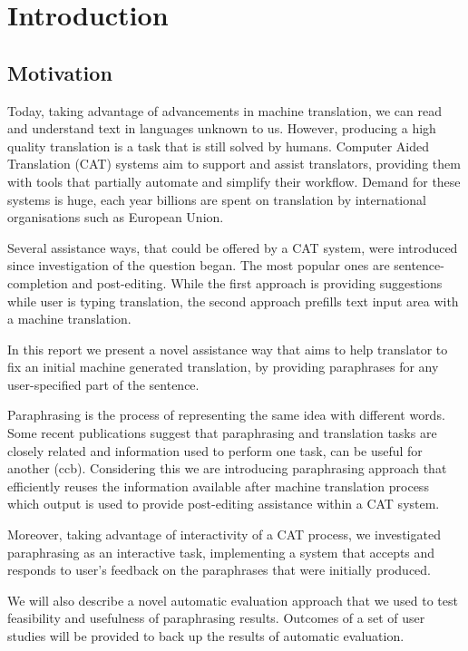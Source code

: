 \chapter{Introduction}
  
\section{Motivation}

Today, taking advantage of advancements in machine translation, we can read and understand text in languages unknown to us. However, producing a high quality translation is a task that is still solved by humans. Computer Aided Translation (CAT) systems aim to support and assist translators, providing them with tools that partially automate and simplify their workflow. Demand for these systems is huge, each year billions are spent on translation by international organisations such as European Union. 

Several assistance ways, that could be offered by a CAT system, were introduced since investigation of the question began. The most popular ones are sentence-completion and post-editing. While the first approach is providing suggestions while user is typing translation, the second approach prefills text input area with a machine translation. 

In this report we present a novel assistance way that aims to help translator to fix an initial machine generated translation, by providing paraphrases for any user-specified part of the sentence.

Paraphrasing is the process of  representing the same idea with different words. Some recent publications suggest that paraphrasing and translation tasks are closely related and information used to perform one task, can be useful for another (ccb). Considering this we are introducing paraphrasing approach that efficiently reuses the information available after machine translation process which output is used to provide post-editing assistance within a CAT system.

Moreover, taking advantage of interactivity of a CAT process, we investigated paraphrasing as an interactive task, implementing a system that accepts and responds to user's feedback on the paraphrases that were initially produced.

We will also describe a novel automatic evaluation approach that we used to test feasibility and usefulness of paraphrasing results. Outcomes of a set of user studies will be provided to back up the results of automatic evaluation.

